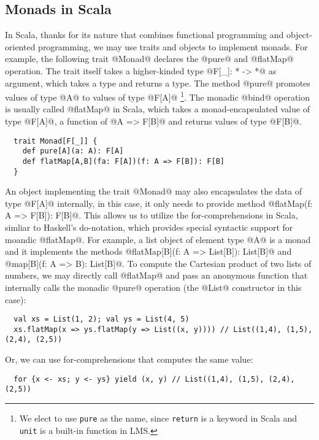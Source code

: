 \subsection{Monads in Scala}

In Scala, thanks for its nature that combines functional programming and
object-oriented programming, we may use traits and objects to implement monads.
For example, the following trait @Monad@ declares the @pure@ and @flatMap@
operation. The trait itself takes a higher-kinded type @F[_]: * -> *@ as argument,
which takes a type and returns a type. The method @pure@ promotes values of type
@A@ to values of type @F[A]@ \footnote{We elect to use \texttt{pure} as the name, since \texttt{return} is a keyword in Scala and \texttt{unit} is a built-in function in LMS.}. The monadic @bind@ operation is usually called
@flatMap@ in Scala, which takes a monad-encapsulated value of type @F[A]@, a function of
@A => F[B]@ and returns values of type @F[B]@.

\begin{lstlisting}
  trait Monad[F[_]] {
    def pure[A](a: A): F[A]
    def flatMap[A,B](fa: F[A])(f: A => F[B]): F[B]
  }
\end{lstlisting}

An object implementing the trait @Monad@ may also encapsulates the data of type
@F[A]@ internally, in this case, it only needs to provide method
@flatMap(f: A => F[B]): F[B]@. This allows us to utilize the for-comprehensions
in Scala, simliar to Haskell's do-notation, which provides special syntactic
support for moandic @flatMap@. For example, a list object of element type @A@ is
a monad and it implements the methods @flatMap[B](f: A => List[B]): List[B]@ and
@map[B](f: A => B): List[B]@. To compute the Cartesian product of two lists of
numbers, we may directly call @flatMap@ and pass an anonymous function that
internally calls the monadic @pure@ operation (the @List@ constructor in this
case):

\begin{lstlisting}
  val xs = List(1, 2); val ys = List(4, 5)
  xs.flatMap(x => ys.flatMap(y => List((x, y)))) // List((1,4), (1,5), (2,4), (2,5))
\end{lstlisting}

Or, we can use for-comprehensions that computes the same value:

\begin{lstlisting}
  for {x <- xs; y <- ys} yield (x, y) // List((1,4), (1,5), (2,4), (2,5))
\end{lstlisting}

